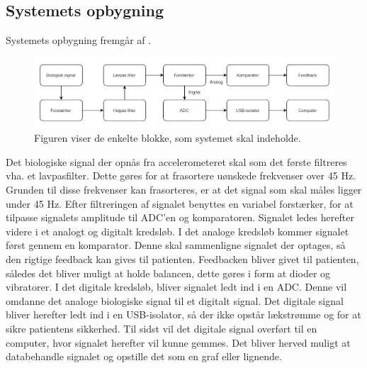 

\subsection{Systemets opbygning} 
Systemets opbygning fremgår af .

\begin{figure}[H]
	\centering
	\includegraphics[scale=0.7]{figures/cProblemloesning/Systemopbygning.PNG}
	\caption{Figuren viser de enkelte blokke, som systemet skal indeholde.}
	\label{kravblok}
\end{figure}

Det biologiske signal der opnås fra accelerometeret skal som det første filtreres vha. et lavpasfilter. Dette gøres for at frasortere uønskede frekvenser  over 45 Hz. Grunden til disse frekvenser kan frasorteres, er at det signal som skal måles ligger under 45 Hz. Efter filtreringen af signalet benyttes en variabel forstærker, for at tilpasse signalets amplitude til ADC’en og komparatoren. Signalet ledes herefter videre i et analogt og digitalt kredsløb. I det analoge kredsløb kommer signalet først gennem en komparator. Denne skal sammenligne signalet der optages, så den rigtige feedback kan gives til patienten. Feedbacken bliver givet til patienten, således det bliver muligt at holde balancen, dette gøres i form at dioder og vibratorer. I det digitale kredsløb, bliver signalet ledt ind i en ADC. Denne vil omdanne det analoge biologiske signal til et digitalt signal. Det digitale signal bliver herefter ledt ind i en USB-isolator, så der ikke opstår lækstrømme og for at sikre patientens sikkerhed. Til sidst vil det digitale signal overført til en computer, hvor signalet herefter vil kunne gemmes. Det bliver herved muligt at databehandle signalet og opstille det som en graf eller lignende.


